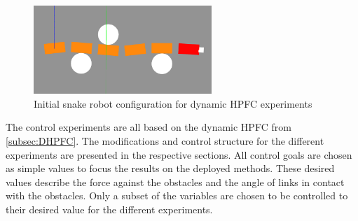 \begin{figure}
    \centering
    \includegraphics[width=0.6\textwidth]{figures/experiments/initial-gazebo.png}
    \caption{Initial snake robot configuration for dynamic HPFC experiments}
    \label{fig:init-gazebo}
\end{figure}

The control experiments are all based on the dynamic HPFC from \ref{subsec:DHPFC}. The modifications and control structure for the different experiments are presented in the respective sections. All control goals are chosen as simple values to focus the results on the deployed methods. These desired values describe the force against the obstacles and the angle of links in contact with the obstacles. Only a subset of the variables are chosen to be controlled to their desired value for the different experiments. 